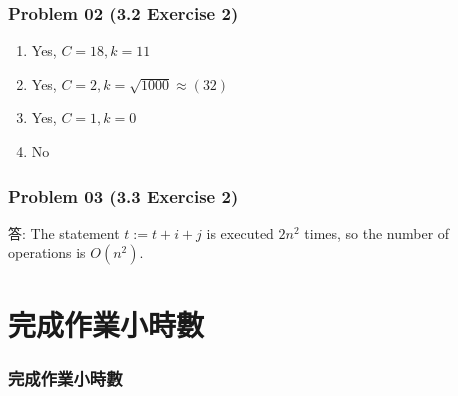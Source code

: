 \documentclass[14pt,hyperref={bookmarks=false}]{beamer}
\begin{document}
	\begin{frame}
	\frametitle{Problem 02 (3.2 Exercise 2)}
	\fontsize{10}{10pt}\selectfont
	\begin{enumerate}[label=(\alph*)]
	\item Yes, $C = 18, k = 11$
	\item Yes, $C = 2, k = \sqrt{1000}\approx(32)$
	\item Yes, $C = 1, k = 0$
	\item No
	\end{enumerate}
	\end{frame}
	
	\begin{frame}
	\frametitle{Problem 03 (3.3 Exercise 2)}
	\fontsize{10}{10pt}\selectfont
	答: The statement $t := t + i + j$ is executed $2n^2$ times, so the number of operations is $O(n^2)$.
	\end{frame}
	


		
\section{完成作業小時數}

\begin{frame}
\frametitle{完成作業小時數}
\centerline{\fontsize{16}{16pt}}	
\end{frame}

\end{document}
